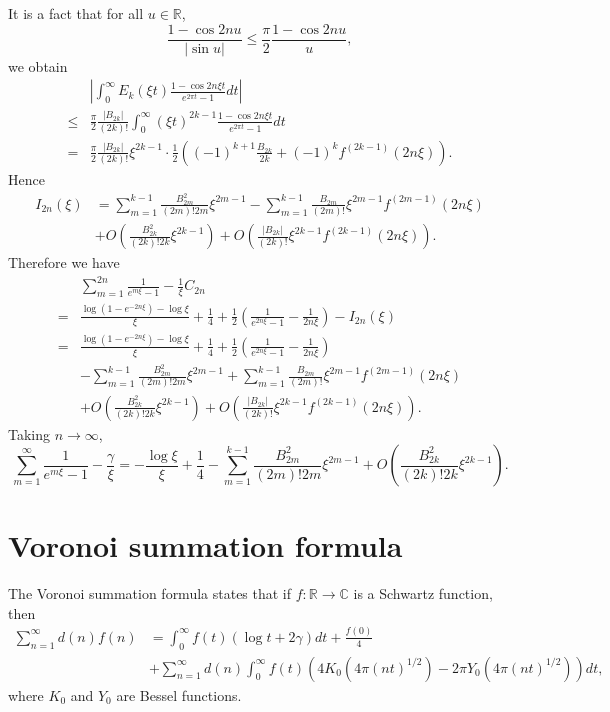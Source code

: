 \documentclass{amsart}
\begin{document}
It is a fact that for all $u \in \mathbb{R}$,
\[
\frac{1-\cos 2n u}{|\sin u|} \leq \frac{\pi}{2} \frac{1-\cos 2n u}{u},
\]
we obtain
\[
\begin{split}
&\left| \int_0^\infty E_k(\xi t)  \frac{1-\cos 2n\xi t}{e^{2\pi t}-1} dt\right|\\
\leq& \frac{\pi}{2} \frac{|B_{2k}|}{(2k)!} \int_0^\infty (\xi t)^{2k-1} \frac{1-\cos 2n\xi t}{e^{2\pi t}-1} dt\\
=& \frac{\pi}{2} \frac{|B_{2k}|}{(2k)!} \xi^{2k-1} \cdot \frac{1}{2}
\left(
(-1)^{k+1} \frac{B_{2k}}{2k}+(-1)^{k} f^{(2k-1)}(2n\xi)
\right).
\end{split}
\]
Hence
\begin{align*}
I_{2n}(\xi)&=\sum_{m=1}^{k-1} \frac{B_{2m}^2}{(2m)! 2m} \xi^{2m-1}
 -\sum_{m=1}^{k-1} \frac{B_{2m}}{(2m)!} \xi^{2m-1} f^{(2m-1)}(2n\xi)\\
 &+O\left( \frac{B_{2k}^2}{(2k)!2k} \xi^{2k-1}\right)
 +O\left( \frac{|B_{2k}|}{(2k)!} \xi^{2k-1} f^{(2k-1)}(2n\xi) \right).
\end{align*}
Therefore we have
\[
\begin{split}
&\sum_{m=1}^{2n} \frac{1}{e^{m\xi}-1} - \frac{1}{\xi} C_{2n}\\
=&\frac{\log(1-e^{-2n \xi})-\log \xi}{\xi}
+\frac{1}{4}+\frac{1}{2}\left( \frac{1}{e^{2n \xi}-1}-\frac{1}{2n\xi}\right)-I_{2n}(\xi)\\
=&\frac{\log(1-e^{-2n \xi})-\log \xi}{\xi}+\frac{1}{4}+\frac{1}{2}\left( \frac{1}{e^{2n \xi}-1}-\frac{1}{2n\xi}\right)\\
&-\sum_{m=1}^{k-1} \frac{B_{2m}^2}{(2m)! 2m} \xi^{2m-1}
+\sum_{m=1}^{k-1} \frac{B_{2m}}{(2m)!} \xi^{2m-1} f^{(2m-1)}(2n\xi)\\
&+O\left( \frac{B_{2k}^2}{(2k)!2k} \xi^{2k-1}\right)
 +O\left( \frac{|B_{2k}|}{(2k)!} \xi^{2k-1} f^{(2k-1)}(2n\xi) \right).
\end{split}
\]
Taking $n \to \infty$,
\[
\sum_{m=1}^\infty \frac{1}{e^{m\xi}-1} - \frac{\gamma}{\xi}=-\frac{\log \xi}{\xi}
+\frac{1}{4}-\sum_{m=1}^{k-1} \frac{B_{2m}^2}{(2m)! 2m} \xi^{2m-1}+O\left( \frac{B_{2k}^2}{(2k)!2k} \xi^{2k-1}\right).
\]






\section{Voronoi summation formula}
The Voronoi summation formula  \cite[p.~182]{cohen} states that if $f:\mathbb{R} \to \mathbb{C}$
is a Schwartz function, then
\begin{align*}
\sum_{n=1}^\infty d(n) f(n)&=\int_0^\infty f(t)(\log t + 2\gamma) dt + \frac{f(0)}{4}\\
&+\sum_{n=1}^\infty d(n) \int_0^\infty f(t)(4K_0(4\pi(nt)^{1/2})-2\pi Y_0(4\pi(nt)^{1/2})) dt,
\end{align*}
where $K_0$ and $Y_0$ are Bessel functions. 
\end{document}
